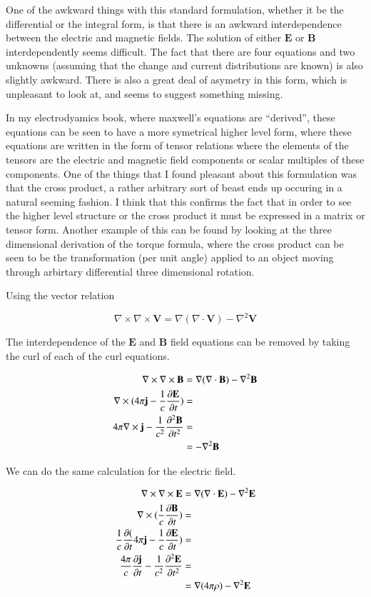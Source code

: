 \documentclass{article}      %
\newcommand{\grad}[1]{\nabla#1}
\newcommand{\curl}[1]{\nabla \times #1}
\newcommand{\Curl}[1]{\nabla \times \mathbf{#1}}
\newcommand{\Diverg}[1]{\nabla \cdot \mathbf{#1}}
\newcommand{\curlCurl}[1]{\curl\Curl{#1}}
\newcommand{\Delsquared}[1]{{\nabla^2}{\mathbf{#1}}}
\newcommand{\ddt}[1]{ {{\partial{#1}} \over {\partial{t}}}}
\newcommand{\Ddt}[1]{ {{\partial{\mathbf{#1}}} \over {\partial{t}}}}
\newcommand{\Ddts}[1]{ {{\partial^2{\mathbf{#1}}} \over {\partial{t}^2}}}
\newcommand{\Bj}[0]{\mathbf{j}}
\newcommand{\BB}[0]{\mathbf{B}}
\newcommand{\BE}[0]{\mathbf{E}}
\begin{document}
One of the awkward things with this standard formulation, whether it be the 
differential or the integral form, is that there 
is an awkward interdependence between the electric and magnetic fields. 
The solution of either $\BE$ or $\BB$ interdependently seems difficult.  The 
fact that there are four equations and two unknowns (assuming that the 
change and current distributions are known) is also slightly awkward.
There is also a great deal of asymetry in this form, which is unpleasant
to look at, and seems to suggest something missing.

In my electrodyamics book, where maxwell's equations are ``derived'',
these equations can be seen to have a more symetrical higher level form, where
these equations are written in the form of tensor relations where
the elements of the tensors are the electric and magnetic field components 
or scalar multiples of these components.  One of the things that I found 
pleasant about this formulation was that the cross product, a rather 
arbitrary sort of beast ends up occuring in a natural seeming fashion.  I 
think that this confirms the fact that in order to see the higher level 
structure or the cross product it must be expressed in a matrix or tensor form.
Another example of this can be found by looking at the three dimensional 
derivation of the torque formula, where the 
cross product can be seen to be the transformation (per unit angle)
applied to an object moving through arbirtary differential three dimensional 
rotation.

Using the vector relation

\begin{equation*}
\curlCurl{V} = \grad (\Diverg V) - \Delsquared{V}
\end{equation*}

The interdependence of the $\BE$ and $\BB$ field equations can be removed by taking the
curl of each of the curl equations.

\begin{align*}
\curlCurl{B} &= \grad (\Diverg{B}) - \Delsquared{B} \\
\curl(4\pi\Bj - {1 \over c} \Ddt{E}) &= \\
4\pi \Curl{j} - {1 \over c^2} \Ddts{B} &= \\
      	     &= 		   - \Delsquared{B}
\end{align*}

We can do the same calculation for the electric field.

\begin{align*}
\curlCurl{E} &= \grad (\Diverg{E}) - \Delsquared{E} \\
\curl({1 \over c} \Ddt{B}) &= \\
{1 \over c} \ddt(4\pi \Bj - {1 \over c} \Ddt{E}) &= \\
{4\pi \over c} \Ddt{j} - {1 \over c^2} \Ddts{E} &= \\
             &= \grad (4\pi\rho) - \Delsquared{E} \\
\end{align*}
\end{document}
